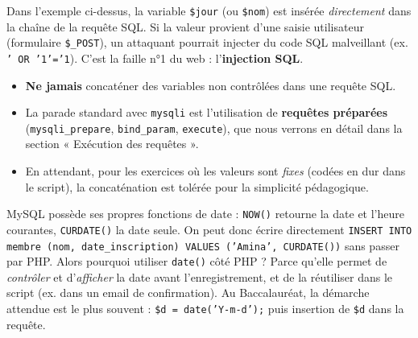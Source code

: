 \documentclass[11pt]{article}
\begin{document}
\begin{attention}
Dans l'exemple ci-dessus, la variable \texttt{\$jour} (ou \texttt{\$nom}) est insérée \emph{directement} dans la chaîne de la requête SQL. Si la valeur provient d'une saisie utilisateur (formulaire \texttt{\$\_POST}), un attaquant pourrait injecter du code SQL malveillant (ex. \texttt{' OR '1'='1}). C'est la faille n°1 du web : l'\textbf{injection SQL}.
\begin{itemize}
\item \textbf{Ne jamais} concaténer des variables non contrôlées dans une requête SQL.
\item La parade standard avec \texttt{mysqli} est l'utilisation de \textbf{requêtes préparées} (\texttt{mysqli\_prepare}, \texttt{bind\_param}, \texttt{execute}), que nous verrons en détail dans la section « Exécution des requêtes ».
\item En attendant, pour les exercices où les valeurs sont \emph{fixes} (codées en dur dans le script), la concaténation est tolérée pour la simplicité pédagogique.
\end{itemize}
\end{attention}

\begin{savaistu}
MySQL possède ses propres fonctions de date : \texttt{NOW()} retourne la date et l'heure courantes, \texttt{CURDATE()} la date seule. On peut donc écrire directement \texttt{INSERT INTO membre (nom, date\_inscription) VALUES ('Amina', CURDATE())} sans passer par PHP. Alors pourquoi utiliser \texttt{date()} côté PHP ? Parce qu'elle permet de \emph{contrôler} et d'\emph{afficher} la date avant l'enregistrement, et de la réutiliser dans le script (ex. dans un email de confirmation). Au Baccalauréat, la démarche attendue est le plus souvent : \texttt{\$d = date('Y-m-d');} puis insertion de \texttt{\$d} dans la requête.
\end{savaistu}
\end{document}
